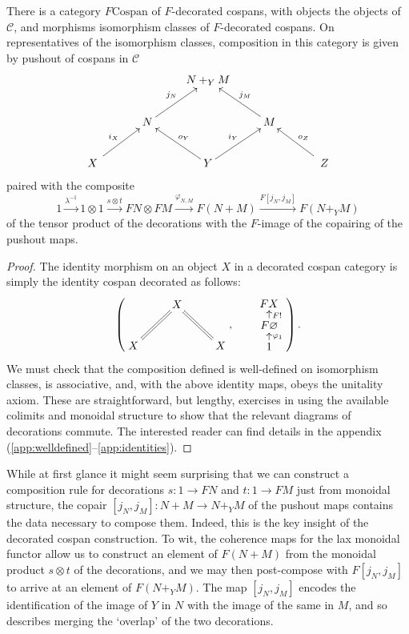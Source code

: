 \begin{proposition}
  There is a category $F\mathrm{Cospan}$ of $F$-decorated cospans, with objects
  the objects of $\mathcal C$, and morphisms isomorphism classes of
  $F$-decorated cospans. On representatives of the isomorphism classes,
  composition in this category is given by pushout of cospans in $\mathcal C$
  \[
    \xymatrix{
      && N+_YM \\
      & N \ar[ur]^{j_N} && M \ar[ul]_{j_M} \\
      \quad X \quad \ar[ur]^{i_X} && Y \ar[ul]_{o_Y} \ar[ur]^{i_Y} && \quad Z
      \quad \ar[ul]_{o_Z}
    }
  \]
  paired with the composite
  \[
    1 \stackrel{\lambda^{-1}}\longrightarrow 1 \otimes 1 \stackrel{s \otimes
    t}\longrightarrow FN \otimes FM \stackrel{\varphi_{N,M}}\longrightarrow
    F(N+M) \stackrel{F[j_N,j_M]}\longrightarrow F(N+_YM)
  \]
  of the tensor product of the decorations with the $F$-image of the copairing
  of the pushout maps.
\end{proposition}

\begin{proof}
  The identity morphism on an object $X$ in a decorated cospan category is
  simply the identity cospan decorated as follows:
  \[
    \left(
    \begin{aligned}
      \xymatrix{
	& X \\  
	X \ar@{=}[ur] && X \ar@{=}[ul]
      }
    \end{aligned}
    ,
    \qquad
    \begin{aligned}
      \xymatrixrowsep{.5pc}
      \xymatrix{
	FX \\
	F\varnothing \ar[u]_{F!} \\
	1 \ar[u]_{\varphi_1}
      }
    \end{aligned}
    \right).
  \]
  We must check that the composition defined is well-defined on isomorphism
  classes, is associative, and, with the above identity maps, obeys the
  unitality axiom. These are straightforward, but lengthy, exercises in
  using the available colimits and monoidal structure to show that
  the relevant diagrams of decorations commute. The interested reader can find
  details in the appendix (\ref{app:welldefined}--\ref{app:identities}).
\end{proof}

\begin{remark}
While at first glance it might seem surprising that we can construct a
composition rule for decorations $s\colon  1\to FN$ and $t\colon  1 \to FM$ just from
monoidal structure, the copair $[j_N,j_M]\colon  N+M \to N+_YM$ of the pushout maps
contains the data necessary to compose them. Indeed, this is the key insight of the
decorated cospan construction. To wit, the coherence maps for the lax monoidal
functor allow us to construct an element of $F(N+M)$ from the monoidal product
$s \otimes t$ of the decorations, and we may then post-compose with $F[j_N,j_M]$ to
arrive at an element of $F(N+_YM)$. The map $[j_N,j_M]$ encodes the
identification of the image of $Y$ in $N$ with the image of the same in $M$, and
so describes merging the `overlap' of the two decorations.
\end{remark}

